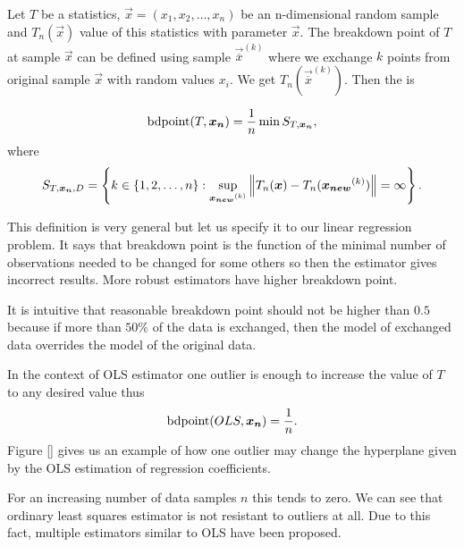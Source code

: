 \begin{definition}
    Let $T$ be a statistics, $\vec{x} = (x_1, x_2,\ldots,x_n)$ be an n-dimensional random sample and $T_n(\vec{x})$ value of this statistics with parameter $\vec{x}$. The breakdown point of $T$ at sample $\vec{x}$ can be defined using sample $\vec{\overline{x}}^{(k)}$ where we exchange $k$ points from original sample $\vec{x}$ with random values $x_i$. We get $T_n(\vec{\overline{x}}^{(k)})$. Then the  is 

\begin{equation}
    \operatorname{bdpoint}(T,\boldsymbol{x_n} ) = \frac{1}{n} \min S_{T, \boldsymbol{x_n}} , 
\end{equation}
where 
\begin{equation}
   S_{T, \boldsymbol{x_n}, D} = 
  \left\{ k \in \{{1,2, \ldots ,n\}} : \sup_{ \boldsymbol{x_{new}}^{(k)} } \left\lVert T_n(\boldsymbol{x}) - T_n(\boldsymbol{x_{new}}^{(k)})\right\rVert = \infty   \right\}.  
\end{equation}
\end{definition}

This definition is very general but let us specify it to our linear regression problem. It says that breakdown point is the function of the minimal number of observations needed to be changed for some others so then the estimator gives incorrect results. More robust estimators have higher breakdown point. 

It is intuitive that reasonable breakdown point should not be higher than $0.5$ \cite{rouss:1986} because if more than $50\%$ of the data is exchanged, then the model of exchanged data overrides the model of the original data. 

In the context of OLS estimator one outlier is enough to increase the value of $T$ to any desired value \cite{agullo2001new} thus 
\begin{equation}
    \operatorname{bdpoint}(OLS,\boldsymbol{x_n} ) = \frac{1}{n}.
\end{equation}
Figure [] gives us an example of how one outlier may change the hyperplane given by the OLS estimation of regression coefficients.


For an increasing number of data samples $n$ this tends to zero. We can see that ordinary least squares estimator is not resistant to outliers at all. Due to this fact, multiple estimators similar to OLS have been proposed.




